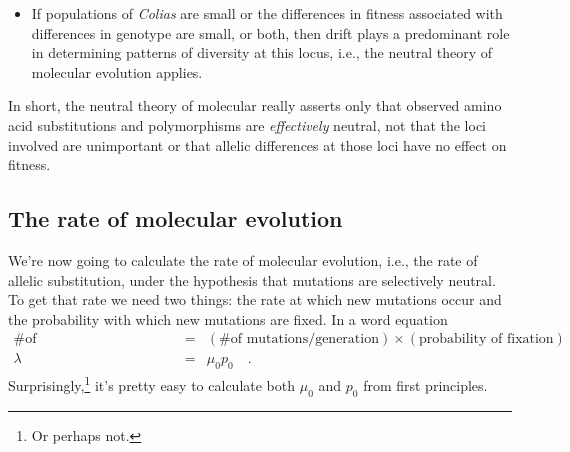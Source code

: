 \documentclass[12pt]{article}
\begin{document}
\begin{itemize}
\begin{itemize}
\item If populations of {\it Colias\/} are small or the differences in
  fitness associated with differences in genotype are small, or both,
  then drift plays a predominant role in determining patterns of
  diversity at this locus, i.e., the neutral theory of molecular
  evolution applies.

\end{itemize}

\end{itemize}

\noindent In short, the neutral theory of molecular really asserts
only that observed amino acid substitutions and polymorphisms are {\it
effectively\/} neutral, not that the loci involved are unimportant or
that allelic differences at those loci have no effect on
fitness.

\subsection*{The rate of molecular evolution}

We're now going to calculate the rate of molecular evolution, i.e.,
the rate of allelic substitution, under the hypothesis that mutations
are selectively neutral. To get that rate we need two things: the rate
at which new mutations occur and the probability with which new
mutations are fixed. In a word equation
\begin{eqnarray*}
\mbox{\# of substitutions/generation} &=& (\mbox{\# of mutations/generation})\times(\mbox{probability
  of fixation}) \\
\lambda &=& \mu_0p_0 \quad .
\end{eqnarray*}
Surprisingly,\footnote{Or perhaps not.} it's pretty easy to calculate
both $\mu_0$ and $p_0$ from first principles.
\end{document}
